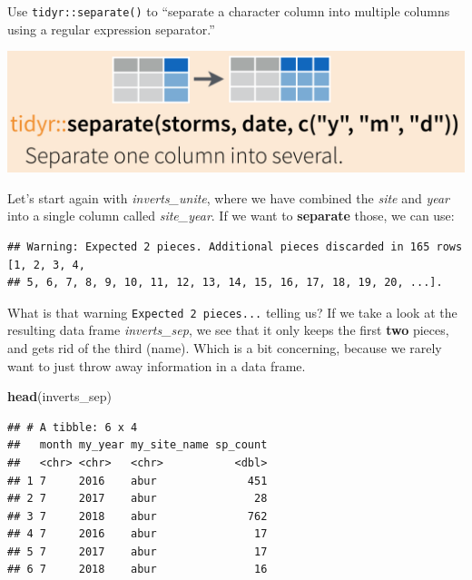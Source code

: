 \documentclass[]{book}
\newenvironment{Shaded}{\begin{snugshade}}{\end{snugshade}}
\newcommand{\DataTypeTok}[1]{\textcolor[rgb]{0.13,0.29,0.53}{#1}}
\newcommand{\KeywordTok}[1]{\textcolor[rgb]{0.13,0.29,0.53}{\textbf{#1}}}
\newcommand{\NormalTok}[1]{#1}
\newcommand{\OperatorTok}[1]{\textcolor[rgb]{0.81,0.36,0.00}{\textbf{#1}}}
\newcommand{\StringTok}[1]{\textcolor[rgb]{0.31,0.60,0.02}{#1}}
\begin{document}
Use \texttt{tidyr::separate()} to ``separate a character column into multiple columns using a regular expression separator.''

\includegraphics{img/rstudio-cheatsheet-separate.png}

Let's start again with \emph{inverts\_unite}, where we have combined the \emph{site} and \emph{year} into a single column called \emph{site\_year}. If we want to \textbf{separate} those, we can use:

\begin{Shaded}
\end{Shaded}

\begin{verbatim}
## Warning: Expected 2 pieces. Additional pieces discarded in 165 rows [1, 2, 3, 4,
## 5, 6, 7, 8, 9, 10, 11, 12, 13, 14, 15, 16, 17, 18, 19, 20, ...].
\end{verbatim}

What is that warning \texttt{Expected\ 2\ pieces...} telling us? If we take a look at the resulting data frame \emph{inverts\_sep}, we see that it only keeps the first \textbf{two} pieces, and gets rid of the third (name). Which is a bit concerning, because we rarely want to just throw away information in a data frame.

\begin{Shaded}
\begin{Highlighting}[]
\KeywordTok{head}\NormalTok{(inverts_sep)}
\end{Highlighting}
\end{Shaded}

\begin{verbatim}
## # A tibble: 6 x 4
##   month my_year my_site_name sp_count
##   <chr> <chr>   <chr>           <dbl>
## 1 7     2016    abur              451
## 2 7     2017    abur               28
## 3 7     2018    abur              762
## 4 7     2016    abur               17
## 5 7     2017    abur               17
## 6 7     2018    abur               16
\end{verbatim}
\end{document}
